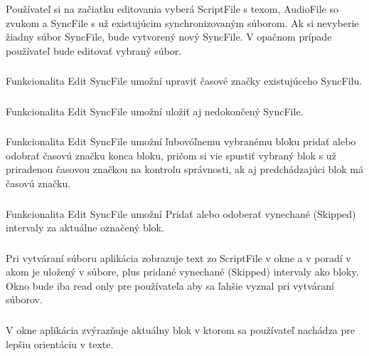 \documentclass{article}
\begin{document}
\subsubsection{}
Používateľ si na začiatku editovania vyberá ScriptFile s texom, AudioFile so zvukom a SyncFile s už existujúcim synchronizovaným súborom. Ak si nevyberie žiadny súbor SyncFile, bude vytvorený nový SyncFile. V opačnom prípade používateľ bude editovať vybraný súbor.

\subsubsection{}
Funkcionalita Edit SyncFile umožní upraviť časové značky existujúceho SyncFilu.

\subsubsection{}
Funkcionalita Edit SyncFile umožní uložiť aj nedokončený SyncFile.

\subsubsection{}
Funkcionalita Edit SyncFile umožní ľubovóľnemu vybranému bloku pridať alebo odobrať časovú značku konca bloku, pričom si vie  spustiť vybraný blok s už priradenou časovou značkou na kontrolu správnosti, ak aj predchádzajúci blok má časovú značku.

\subsubsection{}
Funkcionalita Edit SyncFile umožní Pridať alebo odoberať vynechané (Skipped) intervaly za aktuálne označený blok.

\subsubsection{}
Pri vytváraní súboru aplikácia zobrazuje text zo ScriptFile v okne a v poradí v akom je uložený v súbore, plus pridané vynechané (Skipped) intervaly ako bloky. Okno bude iba read only pre používateľa aby sa ľahšie vyznal pri vytváraní súborov.

\subsubsection{}
V okne aplikácia zvýrazňuje aktuálny blok v ktorom sa používateľ nachádza pre lepšiu orientáciu v texte.
\end{document}
